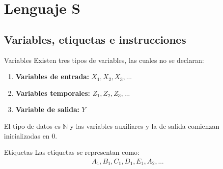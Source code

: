 \chapter{Lenguaje S}

\section{Variables, etiquetas e instrucciones}
\begin{definicion}{Variables}{}
    Existen tres tipos de variables, las cuales no se declaran:
   \begin{enumerate}
       \item \textbf{Variables de entrada:} $X_1, X_2, X_3, \dotsc$

       \item \textbf{Variables temporales:} $Z_1, Z_2, Z_3, \dotsc$

       \item \textbf{Variable de salida:} $Y$
   \end{enumerate} 

   El tipo de datos es $\mathbb{N}$ y las variables auxiliares y la de salida
   comienzan inicializadas en 0.
\end{definicion}

\begin{definicion}{Etiquetas}{}
    Las etiquetas se representan como:
    \begin{gather*}
        A_1, B_1, C_1, D_1, E_1, A_2, \dotsc
    \end{gather*}
\end{definicion}

